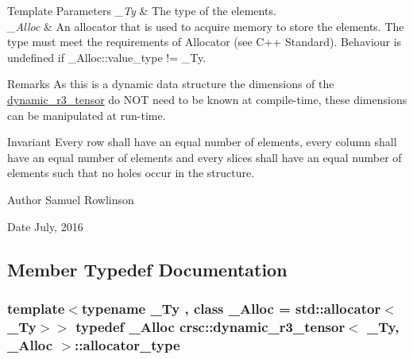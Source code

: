\begin{DoxyTemplParams}{Template Parameters}
{\em \+\_\+\+Ty} & The type of the elements. \\
\hline
{\em \+\_\+\+Alloc} & An allocator that is used to acquire memory to store the elements. The type must meet the requirements of {\ttfamily Allocator} (see C++ Standard). Behaviour is undefined if {\ttfamily \+\_\+\+Alloc\+::value\+\_\+type != \+\_\+\+Ty}. \\
\hline
\end{DoxyTemplParams}
\begin{DoxyRemark}{Remarks}
As this is a dynamic data structure the dimensions of the {\ttfamily \hyperlink{classcrsc_1_1dynamic__r3__tensor}{dynamic\+\_\+r3\+\_\+tensor}} do N\+OT need to be known at compile-\/time, these dimensions can be manipulated at run-\/time. 
\end{DoxyRemark}
\begin{DoxyInvariant}{Invariant}
Every row shall have an equal number of elements, every column shall have an equal number of elements and every slices shall have an equal number of elements such that no holes occur in the structure. 
\end{DoxyInvariant}
\begin{DoxyAuthor}{Author}
Samuel Rowlinson 
\end{DoxyAuthor}
\begin{DoxyDate}{Date}
July, 2016 
\end{DoxyDate}


\subsection{Member Typedef Documentation}
\subsubsection[{\texorpdfstring{allocator\+\_\+type}{allocator_type}}]{\setlength{\rightskip}{0pt plus 5cm}template$<$typename \+\_\+\+Ty , class \+\_\+\+Alloc  = std\+::allocator$<$\+\_\+\+Ty$>$$>$ typedef \+\_\+\+Alloc {\bf crsc\+::dynamic\+\_\+r3\+\_\+tensor}$<$ \+\_\+\+Ty, \+\_\+\+Alloc $>$\+::{\bf allocator\+\_\+type}}\hypertarget{classcrsc_1_1dynamic__r3__tensor_af537557b80397a63ad30f77ba9660a22}{}\label{classcrsc_1_1dynamic__r3__tensor_af537557b80397a63ad30f77ba9660a22}
